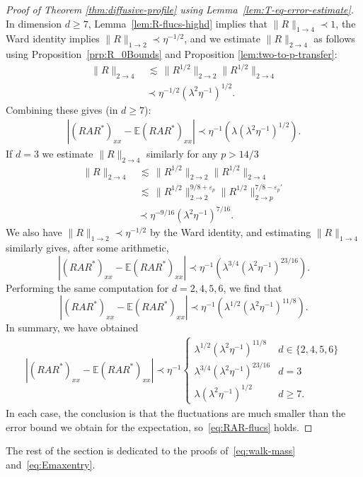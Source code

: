 \documentclass[11pt]{amsart}
\def\Expec{{\mathbb E}}
\def\eps{{\varepsilon}}
\def\lsim{{\,\lesssim\,}}
\newcommand{\ldom}{\prec}
\numberwithin{equation}{section}
\numberwithin{theorem}{section}
\begin{document}
\begin{proof}[Proof of Theorem \ref{thm:diffusive-profile} using Lemma~\ref{lem:T-eq-error-estimate}]
In dimension $d\geq 7$, Lemma~\ref{lem:R-flucs-highd} implies that
$\|R\|_{1\to 4} \ldom 1$, the Ward identity implies $\|R\|_{1\to 2}\ldom \eta^{-1/2}$,
and we estimate $\|R\|_{2\to 4}$ as follows using Proposition~\ref{prp:R_0Bounds} and Proposition \ref{lem:two-to-p-transfer}:
\begin{align*}
\|R\|_{2\to 4}
&\lsim \|R^{1/2}\|_{2\to 2} \|R^{1/2}\|_{2\to 4} \\
&\ldom \eta^{-1/2} (\lambda^2\eta^{-1})^{1/2}.
\end{align*}
Combining these gives (in $d\geq 7$):
\begin{align*}
|(RAR^*)_{xx} - \Expec (RAR^*)_{xx}| \ldom \eta^{-1} (\lambda (\lambda^2\eta^{-1})^{1/2}).
\end{align*}
If $d=3$ we estimate $\|R\|_{2\to 4}$ similarly for any $p>14/3$
\begin{align*}
\|R\|_{2\to 4}
&\lsim \|R^{1/2}\|_{2\to 2} \|R^{1/2}\|_{2\to 4} \\
&\lsim \|R^{1/2}\|_{2\to 2}^{9/8+\eps_p} \|R^{1/2}\|_{2\to p}^{7/8-\eps_p'} \\
&\ldom \eta^{-9/16} (\lambda^2\eta^{-1})^{7/16}.
\end{align*}
We also have $\|R\|_{1\to 2}\ldom \eta^{-1/2}$ by the Ward identity,
and estimating $\|R\|_{1\to 4}$ similarly gives, after some arithmetic,
\[
|(RAR^*)_{xx} - \Expec (RAR^*)_{xx}| \ldom
\eta^{-1} (\lambda^{3/4} (\lambda^2\eta^{-1})^{23/16}).
\]
Performing the same computation for $d=2,4,5,6$, we find that
\[
|(RAR^*)_{xx} - \Expec (RAR^*)_{xx}| \ldom
\eta^{-1} (\lambda^{1/2} (\lambda^2\eta^{-1})^{11/8}).
\]
In summary, we have obtained
\begin{align}
\label{eq:ComputedRAR-Flucs}
|(RAR^*)_{xx} - \Expec (RAR^*)_{xx}| \ldom
\eta^{-1}
\begin{cases}
\lambda^{1/2}(\lambda^2\eta^{-1})^{11/8}&d\in\{2,4,5,6\}\\
\lambda^{3/4}(\lambda^2\eta^{-1})^{23/16}&d=3\\
\lambda (\lambda^2\eta^{-1})^{1/2}&d\geq 7.
\end{cases}
\end{align}
In each case, the conclusion is that the fluctuations are much smaller than the error bound we obtain for the expectation,
so~\eqref{eq:RAR-flucs} holds.
\end{proof}

The rest of the section is dedicated to the proofs of~\eqref{eq:walk-mass} and~\eqref{eq:Emaxentry}.
\end{document}
